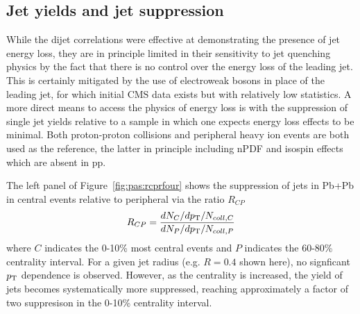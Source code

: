 

\subsection{Jet yields and jet suppression}

While the dijet correlations were effective at demonstrating the presence of jet energy loss, 
they are in principle limited in their sensitivity to jet quenching physics by the fact that
there is no control over the energy loss of the leading jet.
This is certainly mitigated by the use of electroweak bosons in place of the leading jet,
for which initial CMS data exists but with relatively low statistics.
A more direct means to access the physics of energy loss is with the suppression of single
jet yields relative to a sample in which one expects energy loss effects to be minimal.
Both proton-proton collisions and peripheral heavy ion events are both used as the reference,
the latter in principle including nPDF and isospin effects which are absent in pp.

The left panel of Figure~\ref{fig:pas:rcprfour} shows the suppression of jets in Pb+Pb
in central events relative to peripheral via the ratio $R_{CP}$
\begin{equation}
R_{CP} = \frac{dN_{C}/d\mbox{$p_{\mathrm{T}}$} / N_{coll,C}} {dN_{P}/d\mbox{$p_{\mathrm{T}}$} / N_{coll,P}}
\end{equation}
where $C$ indicates the 0-10\% most central events and $P$ indicates the 60-80\% centrality interval.
For a given jet radius (e.g. $R=0.4$ shown here), no signficant $\mbox{$p_{\mathrm{T}}$}$ dependence is observed.
However, as the centrality is increased, the yield of jets becomes systematically more suppressed,
reaching approximately a factor of two suppresison in the 0-10\% centrality interval.

